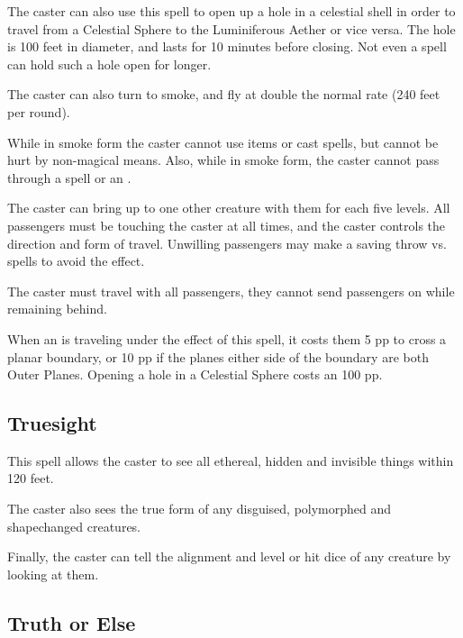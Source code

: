 \begin{multicols*}{2}
The caster can also use this spell to open up a hole in a celestial shell in order to travel from a Celestial Sphere to the Luminiferous Aether or vice versa. The hole is 100 feet in diameter, and lasts for 10 minutes before closing. Not even a  spell can hold such a hole open for longer.

The caster can also turn to smoke, and fly at double the normal rate (240 feet per round).

While in smoke form the caster cannot use items or cast spells, but cannot be hurt by non-magical means. Also, while in smoke form, the caster cannot pass through a  spell or an .

The caster can bring up to one other creature with them for each five levels. All passengers must be touching the caster at all times, and the caster controls the direction and form of travel. Unwilling passengers may make a saving throw vs. spells to avoid the effect.

The caster must travel with all passengers, they cannot send passengers on while remaining behind.

When an  is traveling under the effect of this spell, it costs them 5 pp to cross a planar boundary, or 10 pp if the planes either side of the boundary are both Outer Planes. Opening a hole in a Celestial Sphere costs an  100 pp.

\subsection{Truesight}\label{spell:Truesight}

This spell allows the caster to see all ethereal, hidden and invisible things within 120 feet.

The caster also sees the true form of any disguised, polymorphed and shapechanged creatures.

Finally, the caster can tell the alignment and level or hit dice of any creature by looking at them.

\subsection{Truth or Else}\label{spell:Truth or Else}
\end{multicols*}

